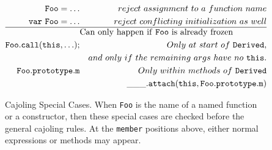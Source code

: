 \documentclass[letterpaper,twocolumn,10pt]{article}
\newcommand{\code}[1]{{\tt {#1}}}              %
\begin{document}
\begin{figure}
\begin{eqnarray}
  \code{Foo = \ldots}        & \label{set:bad-func-assign} & reject\ assignment\ to\ a\ function\ name \\
  \code{var\ Foo = \ldots}   & \label{set:bad-func-init}   & reject\ conflicting\ initialization\ as\ well \\ 
  \hline
 \nonumber & \lefteqn{\mathrm{Can\ only\ happen\ if\ \code{Foo}\ is\ already\ frozen}} & \\ 
  \code{Foo.call(this,\ldots);} 
                   & \label{call:implicit-super-init} & Only\ at\ start\ of\ \code{Derived}, \\
                   & \nonumber                        & and\ only\ if\ the\ remaining\ args\ have\ no\ \code{this}.\\
  \code{Foo.prototype.m} 
                   & \label{read:attach-super-method} & Only\ within\ methods\ of\ \code{Derived} \\
                   & \nonumber                        & \code{\_\_\_.attach(this,Foo.prototype.m)}
\end{eqnarray}

\caption[Cajoling Special Cases]{Cajoling Special Cases. When \code{Foo} is 
the name of a named function or a constructor, then these special cases are 
checked before the general cajoling rules. At the \code{member} positions 
above, either normal expressions or methods may appear.}
\label{tab:special-cases}
\end{figure}
\end{document}
